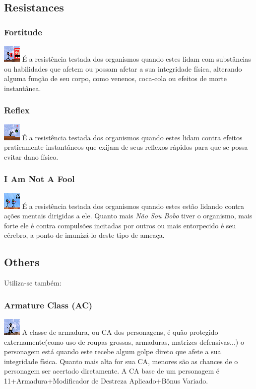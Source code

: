 \documentclass[ letterpaper,12pt]{article}
\begin{document}
\subsection{Resistances}

\subsubsection{Fortitude}
\includegraphics{../data/skills/Img/fortitude.png}
É a resistência testada dos organismos quando estes lidam com substâncias ou habilidades que afetem ou possam afetar a sua integridade física, alterando alguma função de seu corpo, como venenos, coca-cola ou efeitos de morte instantânea.

\subsubsection{Reflex}
\includegraphics{../data/skills/Img/reflexos.png}
É a resistência testada dos organismos quando estes lidam contra efeitos praticamente instantâneos que exijam de seus reflexos rápidos para que se possa evitar dano físico.

\subsubsection{I Am Not A Fool}
\includegraphics{../data/skills/Img/vontade.png}
É a resistência testada dos organismos quando estes estão lidando contra ações mentais dirigidas a ele. Quanto mais {\it Não Sou Bobo} tiver o organismo, mais forte ele é contra compulsões incitadas por outros ou mais entorpecido é seu cérebro, a ponto de imunizá-lo deste tipo de ameaça.

\subsection{Others}
Utiliza-se também:

\subsubsection{Armature Class (AC)}
\includegraphics{../data/skills/Img/ca.png}
A classe de armadura, ou CA dos personagens, é quão protegido externamente(como uso de roupas grossas, armaduras, matrizes defensivas...) o personagem está quando este recebe algum golpe direto que afete a sua integridade física. Quanto mais alta for sua CA, menores são as chances de o personagem ser acertado diretamente. A CA base de um personagem é 11+Armadura+Modificador de Destreza Aplicado+Bônus Variado.
\end{document}
